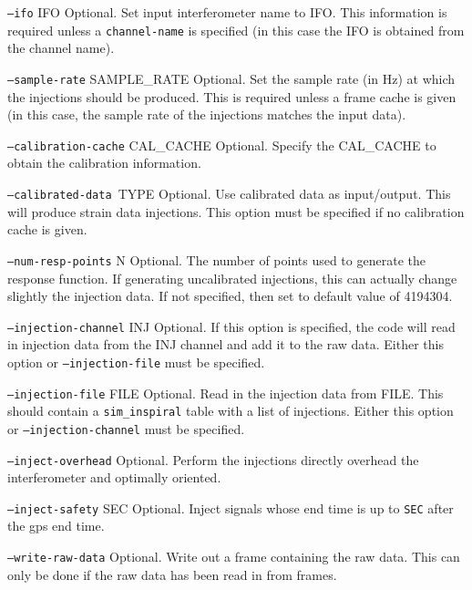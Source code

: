 \begin{entry}
\begin{entry}
\item[\texttt{--ifo} \textsc{IFO}] Optional.  Set input interferometer
name to \textsc{IFO}.  This information is required unless a
\texttt{channel-name} is specified (in this case the \textsc{IFO} is
obtained from the channel name).

\item[\texttt{--sample-rate} \textsc{SAMPLE\_RATE}] Optional.  Set the
sample rate (in Hz) at which the injections should be produced.  This is
required unless a frame cache is given (in this case, the sample rate of
the injections matches the input data).


\item[\texttt{--calibration-cache} \textsc{CAL\_CACHE}] Optional.
Specify the \textsc{CAL\_CACHE} to obtain the calibration information.

\item[\texttt{--calibrated-data }\textsc{TYPE}]  Optional.  Use
calibrated data as input/output.  This will produce strain data
injections.  This option must be specified if no calibration cache is
given.  
  
\item[\texttt{--num-resp-points} \textsc{N}] Optional.  The number of
points used to generate the response function.  If generating
uncalibrated injections, this can actually change slightly the injection
data.  If not specified, then set to default value of 4194304.
 
\item[\texttt{--injection-channel} \textsc{INJ}] Optional.  If this
option is specified, the code will read in injection data from the INJ
channel and add it to the raw data.  Either this option or
\texttt{--injection-file} must be specified.
 
\item[\texttt{--injection-file} \textsc{FILE}] Optional. Read in the
injection data from \textsc{FILE}.  This should contain a
\texttt{sim\_inspiral} table with a list of injections.  Either this
option or \texttt{--injection-channel} must be specified.

\item[\texttt{--inject-overhead}] Optional.  Perform the injections
directly overhead the interferometer and optimally oriented.

\item[\texttt{--inject-safety} \textsc{SEC}] Optional.  Inject signals
whose end time is up to \texttt{SEC} after the gps end time.
 
\item[\texttt{--write-raw-data}]  Optional.  Write out a frame
containing the raw data.  This can only be done if the raw data has been
read in from frames.


\end{entry}
\end{entry}
